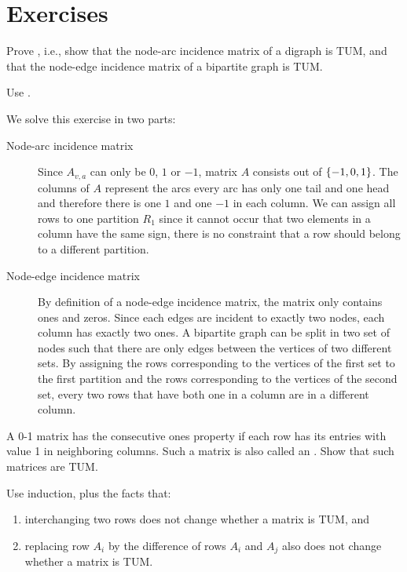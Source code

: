 {\section*{Exercises}
\begin{exercise}
Prove , i.e., show that the node-arc incidence matrix of a digraph is TUM, and that the node-edge incidence matrix of a bipartite graph is TUM.
\begin{hint}
Use .
\end{hint}
\begin{answer}We solve this exercise in two parts:
\begin{description}
 \item [Node-arc incidence matrix] Since $A_{v,a}$ can only be $0$, $1$ or $-1$, matrix $A$ consists out of $\left\{ -1,0,1 \right\}$. The columns of $A$ represent the arcs every arc has only one tail and one head and therefore there is one $1$ and one $-1$ in each column. We can assign all rows to one partition $R_1$ since it cannot occur that two elements in a column have the same sign, there is no constraint that a row should belong to a different partition.
 \item [Node-edge incidence matrix] By definition of a node-edge incidence matrix, the matrix only contains ones and zeros. Since each edges are incident to exactly two nodes, each column has exactly two ones. A bipartite graph can be split in two set of nodes such that there are only edges between the vertices of two different sets. By assigning the rows corresponding to the vertices of the first set to the first partition and the rows corresponding to the vertices of the second set, every two rows that have both one in a column are in a different column.
\end{description}
\end{answer}
\end{exercise}
\begin{exercise}
A 0-1 matrix has the consecutive ones property if each row has its entries with value 1 in neighboring columns. Such a matrix is also called an . Show that such matrices are TUM.
\begin{hint}
Use induction, plus the facts that:
\begin{enumerate}
 \item interchanging two rows does not change whether a matrix is TUM, and
 \item replacing row $A_i$ by the difference of rows $A_i$ and $A_j$ also does not change whether a matrix is TUM.

\end{enumerate}
\end{hint}
\end{exercise}}
